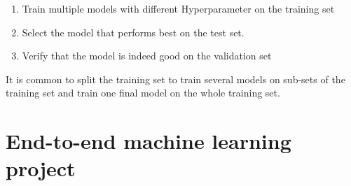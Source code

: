 \documentclass{book}
\begin{document}
\begin{enumerate}
  \item Train multiple models with different Hyperparameter on the training set
  \item Select the model that performs best on the test set.
  \item Verify that the model is indeed good on the validation set
\end{enumerate}

It is common to split the training set to train several models on sub-sets of the training set and train one final model on the whole training set.

\chapter{End-to-end machine learning project}
\end{document}
